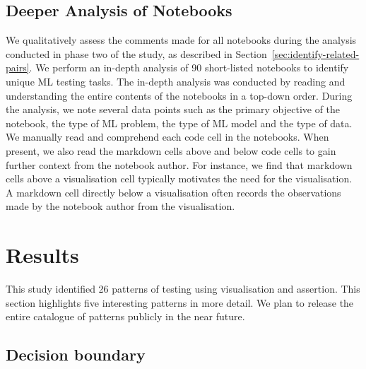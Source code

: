 \documentclass[acmsmall,screen,review,anonymous]{acmart}
\begin{document}
\subsection{Deeper Analysis of Notebooks}\label{sec:deep-dive}

We qualitatively assess the comments made for all notebooks during the analysis conducted in phase two of the study, as described in Section~\ref{sec:identify-related-pairs}. We perform an in-depth analysis of 90 short-listed notebooks to identify unique ML testing tasks. The in-depth analysis was conducted by reading and understanding the entire contents of the notebooks in a top-down order. During the analysis, we note several data points such as the primary objective of the notebook, the type of ML problem, the type of ML model and the type of data. We manually read and comprehend each code cell in the notebooks. When present, we also read the markdown cells above and below code cells to gain further context from the notebook author. For instance, we find that markdown cells above a visualisation cell typically motivates the need for the visualisation. A markdown cell directly below a visualisation often records the observations made by the notebook author from the visualisation.

\section{Results}\label{sec:result}
This study identified 26 patterns of testing using visualisation and assertion. This section highlights five interesting patterns in more detail. We plan to release the entire catalogue of patterns publicly in the near future.

\subsection{Decision boundary}\label{sec:svm}




\end{document}
